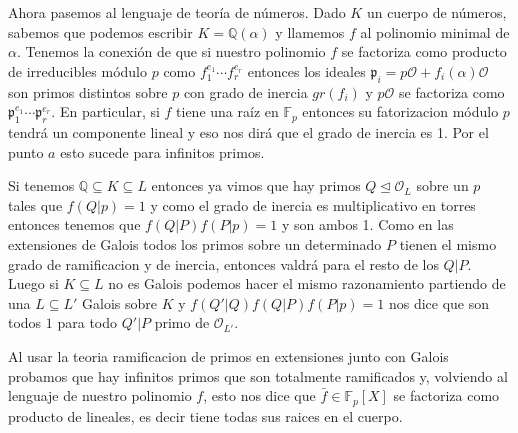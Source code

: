 \documentclass[12pt]{amsart}
\newcommand{\QQ}{\mathbb{Q}}
\newcommand{\FF}{\mathbb{F}}
\newcommand{\pp}{\mathfrak{p}}
\newcommand{\OO}{\mathcal{O}}
\theoremstyle{plain}
\begin{document}
Ahora pasemos al lenguaje de teoría de números. Dado $K$ un cuerpo de 
números, sabemos que podemos escribir $K=\QQ(\alpha)$ y llamemos $f$ al
polinomio minimal de $\alpha$. Tenemos la
conexión de que si nuestro polinomio $f$ se factoriza como 
producto de irreducibles módulo $p$ como $f_1^{e_1}\cdots f_r^{e_r}$ 
entonces los ideales $\pp_i = p\OO + f_i(\alpha)\OO$ son primos distintos
sobre $p$ con grado de inercia $gr(f_i)$ y $p\OO$ se factoriza como
$\pp_1^{e_1}\cdots \pp_r^{e_r}$. En particular, si $f$ tiene una raíz 
en $\FF_p$ entonces su fatorizacion módulo $p$ tendrá un componente 
lineal y eso nos dirá que el grado de inercia es 1. Por el punto $a$ esto
sucede para infinitos primos.

Si tenemos $\QQ\subseteq K\subseteq L$ entonces ya vimos que hay primos
$Q \unlhd \OO_L$ sobre un $p$ tales que $f(Q | p)=1$ y como el grado 
de inercia es multiplicativo en torres entonces 
tenemos que $f(Q | P)f(P|p)=1$ y son ambos 1. Como en las extensiones de 
Galois todos los primos sobre un determinado $P$ tienen el mismo grado 
de ramificacion y de inercia, entonces valdrá para el resto de los $Q|P$.
Luego si $K\subseteq L$ no es Galois podemos hacer el mismo razonamiento
partiendo de una $L\subseteq L'$ Galois sobre $K$ y $f(Q' | Q)f(Q | P)
f(P|p)=1$ nos dice que son todos $1$ para todo $Q'|P$ primo de $\OO_{L'}$.

Al usar la teoria ramificacion de primos en extensiones junto con Galois probamos que hay infinitos primos que son totalmente ramificados y, volviendo al lenguaje de nuestro polinomio $f$, esto nos dice que $\bar{f}\in \FF_p[X]$ se factoriza como producto de lineales, es decir tiene todas sus raices en el cuerpo.
\end{document}
